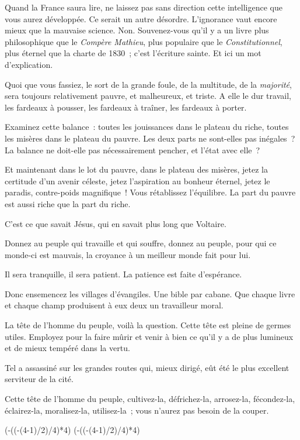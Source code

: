 \documentclass[french,twoside]{book} %
\def\truncdiv#1#2{((#1-(#2-1)/2)/#2)}
\def\moduloop#1#2{(#1-\truncdiv{#1}{#2}*#2)}
\def\modulo#1#2{\number\numexpr\moduloop{#1}{#2}\relax}
\begin{document}
Quand la France saura lire, ne laissez pas sans direction cette intelligence que vous aurez développée. Ce serait un autre désordre. L’ignorance vaut encore mieux que la mauvaise science. Non. Souvenez-vous qu’il y a un livre plus philosophique que le \emph{Compère Mathieu}, plus populaire que le \emph{Constitutionnel}, plus éternel que la charte de 1830 ; c’est l’écriture sainte. Et ici un mot d’explication.\par
Quoi que vous fassiez, le sort de la grande foule, de la multitude, de la \emph{majorité}, sera toujours relativement pauvre, et malheureux, et triste. A elle le dur travail, les fardeaux à pousser, les fardeaux à traîner, les fardeaux à porter.\par
Examinez cette balance : toutes les jouissances dans le plateau du riche, toutes les misères dans le plateau du pauvre. Les deux parts ne sont-elles pas inégales ? La balance ne doit-elle pas nécessairement pencher, et l’état avec elle ?\par
Et maintenant dans le lot du pauvre, dans le plateau des misères, jetez la certitude d’un avenir céleste, jetez l’aspiration au bonheur éternel, jetez le paradis, contre-poids magnifique ! Vous rétablissez  l’équilibre. La part du pauvre est aussi riche que la part du riche.\par
C’est ce que savait Jésus, qui en savait plus long que Voltaire.\par
Donnez au peuple qui travaille et qui souffre, donnez au peuple, pour qui ce monde-ci est mauvais, la croyance à un meilleur monde fait pour lui.\par
Il sera tranquille, il sera patient. La patience est faite d’espérance.\par
Donc ensemencez les villages d’évangiles. Une bible par cabane. Que chaque livre et chaque champ produisent à eux deux un travailleur moral.\par
La tête de l’homme du peuple, voilà la question. Cette tête est pleine de germes utiles. Employez pour la faire mûrir et venir à bien ce qu’il y a de plus lumineux et de mieux tempéré dans la vertu.\par
Tel a assassiné sur les grandes routes qui, mieux dirigé, eût été le plus excellent serviteur de la cité.\par
Cette tête de l’homme du peuple, cultivez-la, défrichez-la, arrosez-la, fécondez-la, éclairez-la, moralisez-la, utilisez-la ; vous n’aurez pas besoin de la couper.
 


\ifbooklet
  \pagestyle{empty}
  \clearpage
  \ifnum\modulo{\value{page}}{4}=0 \hbox{}\newpage\hbox{}\newpage\fi
  \ifnum\modulo{\value{page}}{4}=1 \hbox{}\newpage\hbox{}\newpage\fi
\end{document}
